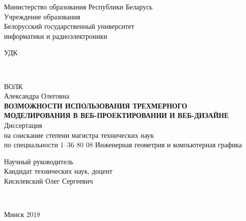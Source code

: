 \begin{titlepage}
  \begin{center}
    Министерство образования Республики Беларусь\\
    Учреждение образования\\
    Белорусский государственный университет \\
    информатики и радиоэлектроники\\[3.2em]

    \begin{flushleft}
      \begin{minipage}{0.4\textwidth}
         УДК
      \end{minipage}\\[3.2em]
    \end{flushleft}

    \MakeUppercase{Волк} \\
    Александра Олеговна \\[5em]


    \MakeUppercase{\textbf{Возможности использования трехмерного моделирования в веб-проектировании и веб-дизайне}}\\[1em]

    Диссертация \\
    на соискание степени магистра технических наук \\
    по специальности 1–36 80 08 Инженерная геометрия и компьютерная графика \\[5em]

    \begin{flushright}
      \begin{minipage}{0.5\textwidth}
        Научный руководитель\\
        Кандидат технических наук, доцент\\
        Кисилевский Олег Сергеевич
      \end{minipage}\\[3.2em]
    \end{flushright}

    \vfill
    {\normalsize Минск 2018}

  \end{center}

\end{titlepage}
